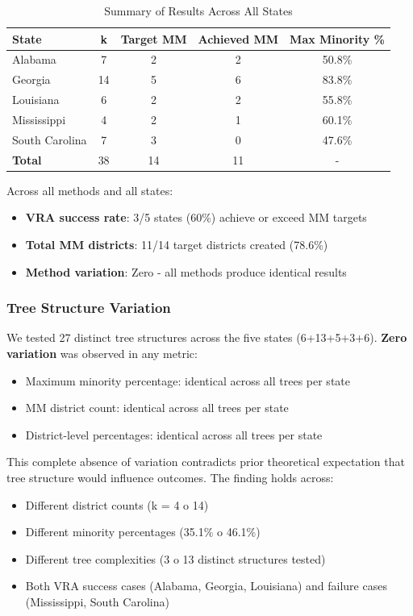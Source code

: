 \begin{table}[h]
\centering
\caption{Summary of Results Across All States}
\label{tab:summary_results}
\begin{tabular}{lcccc}
\toprule
\textbf{State} & \textbf{k} & \textbf{Target MM} & \textbf{Achieved MM} & \textbf{Max Minority \%} \\
\midrule
Alabama & 7 & 2 & 2 & 50.8\% \\
Georgia & 14 & 5 & 6 & 83.8\% \\
Louisiana & 6 & 2 & 2 & 55.8\% \\
Mississippi & 4 & 2 & 1 & 60.1\% \\
South Carolina & 7 & 3 & 0 & 47.6\% \\
\midrule
\textbf{Total} & 38 & 14 & 11 & - \\
\bottomrule
\end{tabular}
\end{table}

Across all methods and all states:
\begin{itemize}
\item \textbf{VRA success rate}: 3/5 states (60\%) achieve or exceed MM targets
\item \textbf{Total MM districts}: 11/14 target districts created (78.6\%)
\item \textbf{Method variation}: Zero - all methods produce identical results
\end{itemize}

\subsubsection{Tree Structure Variation}

We tested 27 distinct tree structures across the five states (6+13+5+3+6). \textbf{Zero variation} was observed in any metric:
\begin{itemize}
\item Maximum minority percentage: identical across all trees per state
\item MM district count: identical across all trees per state
\item District-level percentages: identical across all trees per state
\end{itemize}

This complete absence of variation contradicts prior theoretical expectation that tree structure would influence outcomes. The finding holds across:
\begin{itemize}
\item Different district counts (k = 4 	o 14)
\item Different minority percentages (35.1\% 	o 46.1\%)
\item Different tree complexities (3 	o 13 distinct structures tested)
\item Both VRA success cases (Alabama, Georgia, Louisiana) and failure cases (Mississippi, South Carolina)
\end{itemize}

